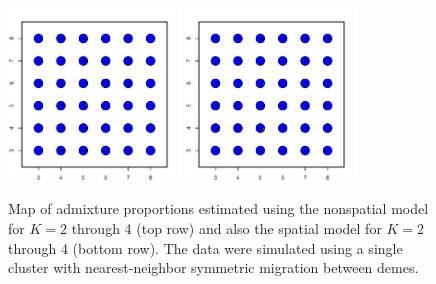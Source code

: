 \documentclass[12pt]{article}
\begin{document}
\begin{figure}
			{\includegraphics[width=1.8in,height=1.8in]{figs/sims/simK1_sp_pies_K6.pdf}}
			{\includegraphics[width=1.8in,height=1.8in]{figs/sims/simK1_sp_pies_K7.pdf}}
	\caption{
	Map of admixture proportions estimated using the nonspatial model for $K=2$ through 4 (top row)
	and also the spatial model for $K=2$ through 4 (bottom row).
	The data were simulated using a single cluster with nearest-neighbor symmetric migration between demes.
    }\label{simK1_pies}
\end{figure}
\end{document}
